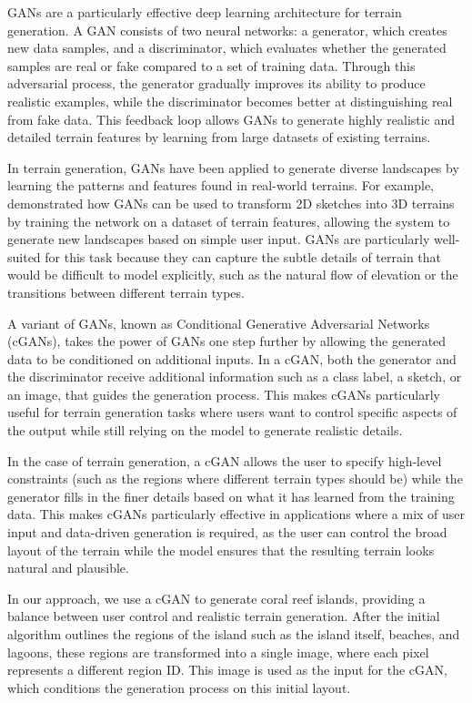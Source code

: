 GANs are a particularly effective deep learning architecture for terrain generation. A GAN consists of two neural networks: a generator, which creates new data samples, and a discriminator, which evaluates whether the generated samples are real or fake compared to a set of training data. Through this adversarial process, the generator gradually improves its ability to produce realistic examples, while the discriminator becomes better at distinguishing real from fake data. This feedback loop allows GANs to generate highly realistic and detailed terrain features by learning from large datasets of existing terrains.

In terrain generation, GANs have been applied to generate diverse landscapes by learning the patterns and features found in real-world terrains. For example, \citep{Guerin2017} demonstrated how GANs can be used to transform 2D sketches into 3D terrains by training the network on a dataset of terrain features, allowing the system to generate new landscapes based on simple user input. GANs are particularly well-suited for this task because they can capture the subtle details of terrain that would be difficult to model explicitly, such as the natural flow of elevation or the transitions between different terrain types.

A variant of GANs, known as Conditional Generative Adversarial Networks (cGANs), takes the power of GANs one step further by allowing the generated data to be conditioned on additional inputs. In a cGAN, both the generator and the discriminator receive additional information such as a class label, a sketch, or an image, that guides the generation process. This makes cGANs particularly useful for terrain generation tasks where users want to control specific aspects of the output while still relying on the model to generate realistic details.

In the case of terrain generation, a cGAN allows the user to specify high-level constraints (such as the regions where different terrain types should be) while the generator fills in the finer details based on what it has learned from the training data. This makes cGANs particularly effective in applications where a mix of user input and data-driven generation is required, as the user can control the broad layout of the terrain while the model ensures that the resulting terrain looks natural and plausible.

In our approach, we use a cGAN to generate coral reef islands, providing a balance between user control and realistic terrain generation. After the initial algorithm outlines the regions of the island such as the island itself, beaches, and lagoons, these regions are transformed into a single image, where each pixel represents a different region ID. This image is used as the input for the cGAN, which conditions the generation process on this initial layout.

